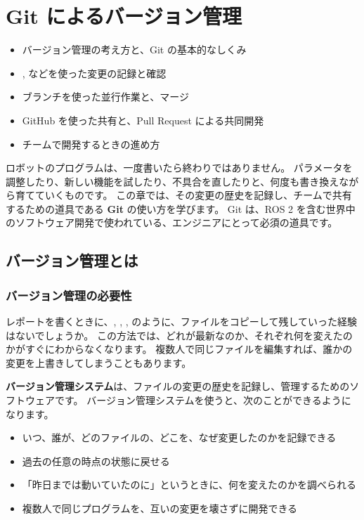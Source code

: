 \chapter{Git によるバージョン管理}
\label{chap:git}

\begin{goalbox}
  \begin{itemize}
    \item バージョン管理の考え方と、Git の基本的なしくみ
    \item {},  などを使った変更の記録と確認
    \item ブランチを使った並行作業と、マージ
    \item GitHub を使った共有と、Pull Request による共同開発
    \item チームで開発するときの進め方
  \end{itemize}
\end{goalbox}

ロボットのプログラムは、一度書いたら終わりではありません。
パラメータを調整したり、新しい機能を試したり、不具合を直したりと、何度も書き換えながら育てていくものです。
この章では、その変更の歴史を記録し、チームで共有するための道具である \textbf{Git} の使い方を学びます。
Git は、ROS 2 を含む世界中のソフトウェア開発で使われている、エンジニアにとって必須の道具です。

\section{バージョン管理とは}
\label{sec:git-vcs}

\subsection{バージョン管理の必要性}

レポートを書くときに、, , ,  のように、ファイルをコピーして残していった経験はないでしょうか。
この方法では、どれが最新なのか、それぞれ何を変えたのかがすぐにわからなくなります。
複数人で同じファイルを編集すれば、誰かの変更を上書きしてしまうこともあります。

\textbf{バージョン管理システム}は、ファイルの変更の歴史を記録し、管理するためのソフトウェアです。
バージョン管理システムを使うと、次のことができるようになります。

\begin{itemize}
  \item いつ、誰が、どのファイルの、どこを、なぜ変更したのかを記録できる
  \item 過去の任意の時点の状態に戻せる
  \item 「昨日までは動いていたのに」というときに、何を変えたのかを調べられる
  \item 複数人で同じプログラムを、互いの変更を壊さずに開発できる
\end{itemize}

